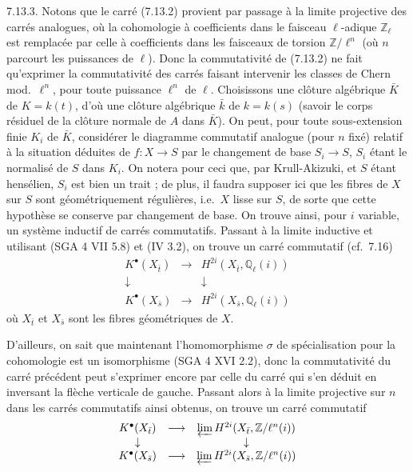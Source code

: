 7.13.3. Notons que le carr\'e (7.13.2) provient par passage \`a la limite projective des carr\'es analogues, o\`u la cohomologie \`a coefficients dans le faisceau $\ell$-adique $\mathbb{Z}_{\ell}$ est remplac\'ee par celle \`a coefficients dans les faisceaux de torsion $\mathbb{Z}/\ell^{n}$ (o\`u $n$ parcourt les puissances de $\ell$). Donc la commutativit\'e de (7.13.2) ne fait qu'exprimer la commutativit\'e des carr\'es faisant intervenir les classes de Chern mod.\ $\ell^{n}$, pour toute puissance $\ell^{n}$ de $\ell$. Choisissons une cl\^oture alg\'ebrique $\bar{K}$ de $K = k(t)$, d'o\`u une cl\^oture alg\'ebrique $\bar{k}$ de $k = k(s)$ (savoir le corps r\'esiduel de la cl\^oture normale de $A$ dans $\bar{K}$). On peut, pour toute sous-extension finie $K_{i}$ de $\bar{K}$, consid\'erer le diagramme commutatif analogue (pour $n$ fix\'e) relatif \`a la situation d\'eduites de $f : X \to S$ par le changement de base $S_{i} \to S$, $S_{i}$ \'etant le normalis\'e de $S$ dans $K_{i}$. On notera pour ceci que, par Krull-Akizuki, et $S$ \'etant hens\'elien, $S_{i}$ est bien un trait ; de plus, il faudra supposer ici que les fibres de $X$ sur $S$ sont g\'eom\'etriquement r\'eguli\`eres, i.e.\ $X$ lisse sur $S$, de sorte que cette hypoth\`ese se conserve par changement de base. On trouve ainsi, pour $i$ variable, un syst\`eme inductif de carr\'es commutatifs. Passant \`a la limite inductive et utilisant (SGA 4 VII 5.8) et (IV 3.2), on trouve un carr\'e commutatif (cf.\ 7.16)
\begin{equation}\label{eq:7.13.4}
\begin{array}{ccc}
K^{\bullet}(X_{\bar{t}}) & \longrightarrow & H^{2i}(X_{\bar{t}}, \mathbb{Q}_{\ell}(i)) \\
\downarrow & & \downarrow \\
K^{\bullet}(X_{\bar{s}}) & \longrightarrow & H^{2i}(X_{\bar{s}}, \mathbb{Q}_{\ell}(i))
\end{array}
\end{equation}
o\`u $X_{\bar{t}}$ et $X_{\bar{s}}$ sont les fibres g\'eom\'etriques de $X$.

D'ailleurs, on sait que maintenant l'homomorphisme $\sigma$ de sp\'ecialisation pour la cohomologie est un isomorphisme (SGA 4 XVI 2.2), donc la commutativit\'e du carr\'e pr\'ec\'edent peut s'exprimer encore par celle du carr\'e qui s'en d\'eduit en inversant la fl\`eche verticale de gauche. Passant alors \`a la limite projective sur $n$ dans les carr\'es commutatifs ainsi obtenus, on trouve un carr\'e commutatif
\begin{equation}\label{eq:7.13.4bis}
\begin{array}{ccc}
K^{\bullet}(X_{\bar{t}}) & \longrightarrow & \varprojlim H^{2i}(X_{\bar{t}}, \mathbb{Z}/\ell^{n}(i)) \\
\downarrow & & \downarrow \\
K^{\bullet}(X_{\bar{s}}) & \longrightarrow & \varprojlim H^{2i}(X_{\bar{s}}, \mathbb{Z}/\ell^{n}(i))
\end{array}
\end{equation}

